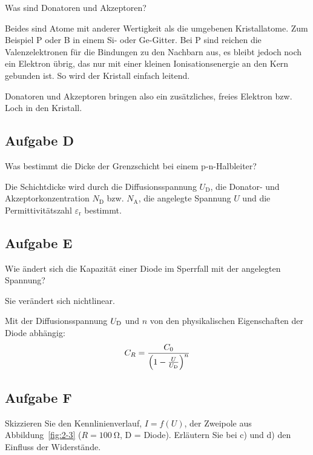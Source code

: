 \begin{problem}
	Was sind Donatoren und Akzeptoren?
\end{problem}

Beides sind Atome mit anderer Wertigkeit als die umgebenen Kristallatome. Zum
Beispiel P oder B in einem Si- oder Ge-Gitter. Bei P sind reichen die
Valenzelektronen für die Bindungen zu den Nachbarn aus, es bleibt jedoch noch
ein Elektron übrig, das nur mit einer kleinen Ionisationsenergie an den Kern
gebunden ist. So wird der Kristall einfach leitend.

Donatoren und Akzeptoren bringen also ein zusätzliches, freies Elektron bzw.
Loch in den Kristall. \cite[§~18.4.2]{meschede-gerthsen_24}

\subsection{Aufgabe D}

\begin{problem}
	Was bestimmt die Dicke der Grenzschicht bei einem p-n-Halbleiter?
\end{problem}

Die Schichtdicke wird durch die Diffusionsspannung $U_\text{D}$, die Donator-
und Akzeptorkonzentration $N_\text{D}$ bzw. $N_\text{A}$, die angelegte
Spannung $U$ und die Permittivitätszahl $\varepsilon_\text{r}$ bestimmt.

\subsection{Aufgabe E}

\begin{problem}
	Wie ändert sich die Kapazität einer Diode im Sperrfall mit der angelegten
	Spannung?
\end{problem}

Sie verändert sich nichtlinear. \cite[§~15.2.2]{beuth/elementare_elektronik}

Mit der Diffusionsspannung $U_\text D$ und $n$ von den physikalischen
Eigenschaften der Diode abhängig:
\cite[§~1.1.1.1.2]{antula/schaltungen_mikroelektronik}
\[
	C_R = \frac{C_0}{\del{1- \frac U{U_\text D}}^n}
\]

\subsection{Aufgabe F}

\begin{problem}
	Skizzieren Sie den Kennlinienverlauf, $I = f(U)$, der Zweipole aus
	Abbildung~\ref{fig:2-3} ($R = \SI{100}\ohm$, D = Diode). Erläutern Sie bei
	c) und d) den Einfluss der Widerstände.
\end{problem}


